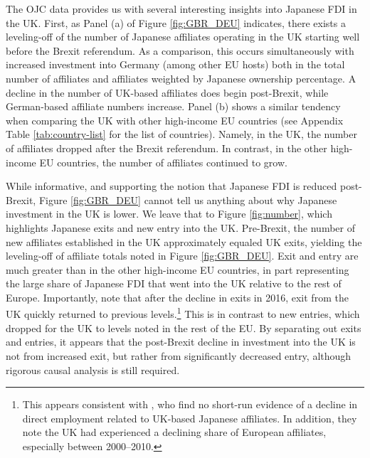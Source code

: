 \documentclass[preprint,11pt,authoryear]{elsarticle}
\begin{document}
The OJC data provides us with several interesting insights into Japanese FDI in the UK. First, as Panel (a) of Figure \ref{fig:GBR_DEU} indicates, there exists a leveling-off of the number of Japanese affiliates operating in the UK starting well before the Brexit referendum. As a comparison, this occurs simultaneously with increased investment into Germany (among other EU hosts) both in the total number of affiliates and affiliates weighted by Japanese ownership percentage. A decline in the number of UK-based affiliates does begin post-Brexit, while German-based affiliate numbers increase. 
Panel (b) shows a similar tendency when comparing the UK with other high-income EU countries (see Appendix Table \ref{tab:country-list} for the list of countries). Namely, in the UK, the number of affiliates dropped after the Brexit referendum. In contrast, in the other high-income EU countries, the number of affiliates continued to grow.
 
While informative, and supporting the notion that Japanese FDI is reduced post-Brexit, Figure \ref{fig:GBR_DEU} cannot tell us anything about why Japanese investment in the UK is lower.  We leave that to Figure \ref{fig:number}, which highlights Japanese exits and new entry into the UK.  Pre-Brexit, the number of new affiliates established in the UK approximately equaled UK exits, yielding the leveling-off of affiliate totals noted in Figure \ref{fig:GBR_DEU}. Exit and entry are much greater than in the other high-income EU countries, in part representing the large share of Japanese FDI that went into the UK relative to the rest of Europe. Importantly, note that after the decline in exits in 2016, exit from the UK quickly returned to previous levels.\footnote{This appears consistent with \cite{porto2023}, who find no short-run evidence of a decline in direct employment related to UK-based Japanese affiliates. In addition, they note the UK had experienced a declining share of European affiliates, especially between 2000--2010.} This is in contrast to new entries, which dropped for the UK to levels noted in the rest of the EU. By separating out exits and entries, it appears that the post-Brexit decline in investment into the UK is not from increased exit, but rather from significantly decreased entry, although rigorous causal analysis is still required.
\end{document}
